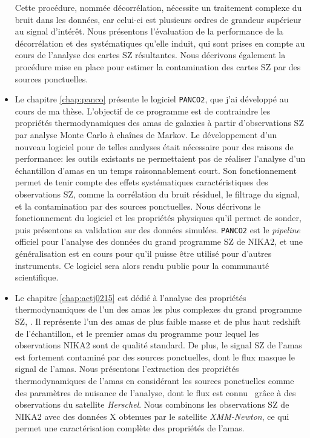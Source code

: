 \begin{itemize}[leftmargin=*]
    Cette procédure, nommée décorrélation, nécessite un traitement complexe du bruit dans les données, car celui-ci est plusieurs ordres de grandeur supérieur au signal d'intérêt.
    Nous présentons l'évaluation de la performance de la décorrélation et des systématiques qu'elle induit, qui sont prises en compte au cours de l'analyse des cartes SZ résultantes.
    Nous décrivons également la procédure mise en place pour estimer la contamination des cartes SZ par des sources ponctuelles.
\item
    Le chapitre \ref{chap:panco} présente le logiciel \texttt{PANCO2}, que j'ai développé au cours de ma thèse.
    L'objectif de ce programme est de contraindre les propriétés thermodynamiques des amas de galaxies à partir d'observations SZ par analyse Monte Carlo à chaînes de Markov.
    Le développement d'un nouveau logiciel pour de telles analyses était nécessaire pour des raisons de performance: les outils existants ne permettaient pas de réaliser l'analyse d'un échantillon d'amas en un temps raisonnablement court.
    Son fonctionnement permet de tenir compte des effets systématiques caractéristiques des observations SZ, comme la corrélation du bruit résiduel, le filtrage du signal, et la contamination par des sources ponctuelles.
    Nous décrivons le fonctionnement du logiciel et les propriétés physiques qu'il permet de sonder, puis présentons sa validation sur des données simulées.
    \texttt{PANCO2} est le \textit{pipeline} officiel pour l'analyse des données du grand programme SZ de NIKA2, et une généralisation est en cours pour qu'il puisse être utilisé pour d'autres instruments.
    Ce logiciel sera alors rendu public pour la communauté scientifique.
\item
    Le chapitre \ref{chap:actj0215} est dédié à l'analyse des propriétés thermodynamiques de l'un des amas les plus complexes du grand programme SZ, \act.
    Il représente l'un des amas de plus faible masse et de plus haut redshift de l'échantillon, et le premier amas du programme pour lequel les observations NIKA2 sont de qualité standard.
    De plus, le signal SZ de l'amas est fortement contaminé par des sources ponctuelles, dont le flux masque le signal de l'amas.
    Nous présentons l'extraction des propriétés thermodynamiques de l'amas en considérant les sources ponctuelles comme des paramètres de nuisance de l'analyse, dont le flux est connu \prior\ grâce à des observations du satellite \textit{Herschel}.
    Nous combinons les observations SZ de NIKA2 avec des données X obtenues par le satellite \textit{XMM-Newton}, ce qui permet une caractérisation complète des propriétés de l'amas.

\end{itemize}
